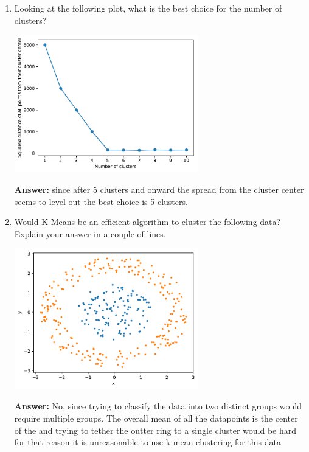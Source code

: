 \begin{Q}
\begin{enumerate}
 \item Looking at the following plot, what is the best choice for the number of clusters?
 \begin{center}
 \includegraphics[width=8cm]{figs/cluster.pdf}
 \end{center}
 \textbf{Answer:} since after 5 clusters and onward the spread from the cluster center seems to level out the best choice is 5 clusters.
 
 \item Would K-Means be an efficient algorithm to cluster the following data? Explain your answer in a couple of lines.
 \begin{center}
 \includegraphics[width=8cm]{figs/concentric.pdf}
 \end{center}
 \textbf{Answer:} No, since trying to classify the data into two distinct groups would require multiple groups. The overall mean of all the datapoints is the center of the and trying to tether the outter ring to a single cluster would be hard for that reason it is unreasonable to use k-mean clustering for this data

\end{enumerate}


\end{Q}
          